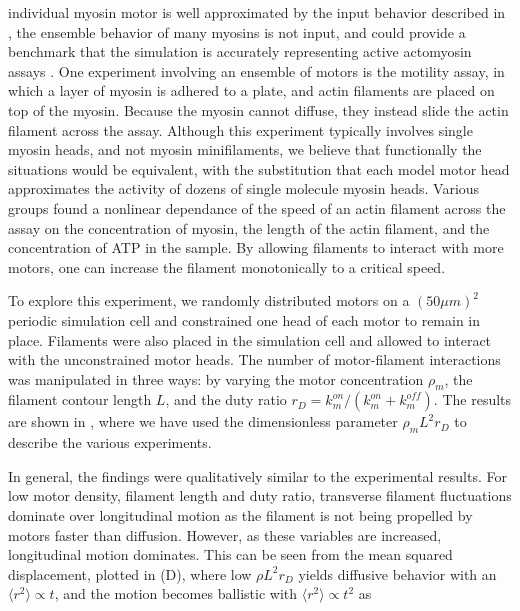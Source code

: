 \documentclass[12pt]{article} \usepackage{times} \usepackage{graphicx}
\begin{document}
    individual myosin motor is well approximated by the input behavior
    described in , the ensemble behavior of many
    myosins is not input, and could provide a benchmark that the simulation is
    accurately representing active actomyosin assays \cite{walcott2012}. One
    experiment involving an ensemble of motors is the motility assay, in which
    a layer of myosin is adhered to a plate, and actin filaments are placed on
    top of the myosin. Because the myosin cannot diffuse, they instead slide
    the actin filament across the assay.  Although this experiment typically
    involves single myosin heads, and not myosin minifilaments, we believe that
    functionally the situations would be equivalent, with the substitution that
    each model motor head approximates the activity of dozens of single
    molecule myosin heads.  Various groups \cite{harris1993, umemoto1990} found
    a nonlinear dependance of the speed of an actin filament across the assay
    on the concentration of myosin, the length of the actin filament, and the
    concentration of ATP in the sample. By allowing filaments to interact with
    more motors, one can increase the filament monotonically to a critical
    speed.  \par To explore this experiment, we randomly distributed motors on
    a $(50\mu m)^2$ periodic simulation cell and constrained one head of each
    motor to remain in place. Filaments were also placed in the simulation cell
    and allowed to interact with the unconstrained motor heads. The number of
    motor-filament interactions was manipulated in three ways: by varying the
    motor concentration $\rho_m$, the filament contour length $L$, and the duty
    ratio $r_D = k_m^{on}/(k_m^{on}+k_m^{off})$.  The results are shown in
    , where we have used the dimensionless parameter $\rho_m
    L^2 r_D$ to describe the various experiments.  \par In general, the
    findings were qualitatively similar to the experimental results.  For low
    motor density, filament length and duty ratio, transverse filament
    fluctuations dominate over longitudinal motion as the filament is not being
    propelled by motors faster than diffusion. However, as these variables are
    increased, longitudinal motion dominates. This can be seen from the mean
    squared displacement, plotted in (D), where low $\rho
    L^2 r_D$ yields diffusive behavior with an $\langle r^2 \rangle \propto t$,
    and the motion becomes ballistic with $\langle r^2\rangle\propto t^2$ as
\end{document}
